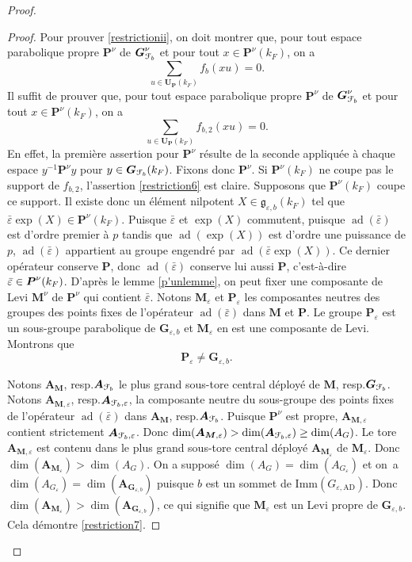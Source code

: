 \documentclass[11pt]{article}
\newcommand{\resp}{resp.\xspace}
\numberwithin{equation}{section}\providecommand{\og}{«\,}\providecommand{\fg}{\,»}
\let\mathcal \EuScript
\let\epsilon\varepsilon
\newcommand{\frg}{\mathfrak{g}}
\newcommand{\AD}{\mathrm{AD}}
\newcommand{\Imm}{\mathrm{Imm}}
\DeclareMathOperator{\ad}{ad}
\newcommand{\bA}{\boldsymbol{A}}
\newcommand{\bG}{\boldsymbol{G}}
\newcommand{\bM}{\boldsymbol{M}}
\newcommand{\bP}{\boldsymbol{P}}
\newcommand{\bU}{\boldsymbol{U}}
\newcommand{\cF}{\mathcal{F}}
\theoremstyle{plain}
\theoremstyle{definition}
\begin{document}
\begin{proof}
\begin{proof}
Pour prouver \eqref{restrictionii}, on doit montrer que, pour tout espace parabolique propre $\bP^{\nu}$ de $\bG_{\cF_{b}}^{\nu}$ et pour tout $x\in \bP^{\nu}(k_{F})$, on a
\[
\sum_{u\in \bU_{\bP}(k_{F})}f_{b}(xu)=0.
\]
Il suffit de prouver que, pour tout espace parabolique propre $\bP^{\nu}$ de $\bG_{\cF_{b}}^{\nu}$ et pour tout $x\in \bP^{\nu}(k_{F})$, on a
\begin{equation}\tag{6}\label{restriction6}
\sum_{u\in \bU_{\bP}(k_{F})}f_{b,2}(xu)=0.
\end{equation}
En effet, la première assertion pour $\bP^{\nu}$ résulte de la seconde appliquée à chaque espace $y^{-1}\bP^{\nu}y$ pour $y\in \bG_{\cF_{b}}(k_{F})$. Fixons donc $\bP^{\nu}$. Si $\bP^{\nu}(k_{F})$ ne coupe pas le support de $f_{b,2}$, l'assertion \eqref{restriction6} est claire. Supposons que $\bP^{\nu}(k_{F})$ coupe ce support. Il existe donc un élément nilpotent $X\in \boldsymbol{\frg}_{\epsilon,b}(k_{F})$ tel que $\bar{\epsilon}\exp(X)\in \bP^{\nu}(k_{F})$. Puisque $\bar{\epsilon}$ et $\exp(X)$ commutent, puisque $\ad(\bar{\epsilon})$ est d'ordre premier à $p$ tandis que $\ad(\exp(X))$ est d'ordre une puissance de $p$, $\ad(\bar{\epsilon})$ appartient au groupe engendré par $\ad(\bar{\epsilon}\exp(X))$. Ce dernier opérateur conserve $\bP$, donc $\ad(\bar{\epsilon})$ conserve lui aussi $\bP$, c'est-à-dire $\bar{\epsilon}\in\nobreak \bP^{\nu}(k_{F})$. D'après le lemme \ref{p'unlemme}, on peut fixer une composante de Levi $\bM^{\nu}$ de $\bP^{\nu}$ qui contient $\bar{\epsilon}$. Notons $\bM_{\epsilon}$ et $\bP_{\epsilon}$ les composantes neutres des groupes des points fixes de l'opérateur $\ad(\bar{\epsilon})$ dans $\bM$ et $\bP$. Le groupe $\bP_{\epsilon}$ est un sous-groupe parabolique de $\bG_{\epsilon,b}$ et $\bM_{\epsilon}$ en est une composante de Levi. Montrons que
\begin{equation}\tag{7}\label{restriction7}
\bP_{\epsilon}\neq\bG_{\epsilon,b}.
\end{equation}

Notons $\bA_{\bM}$, \resp $\bA_{\cF_{b}}$ le plus grand sous-tore central déployé de $\bM$, \resp $\bG_{\cF_{b}}$. Notons $\bA_{\bM,\epsilon}$, \resp $\bA_{\cF_{b},\epsilon}$, la composante neutre du sous-groupe des points fixes de l'opérateur $\ad(\bar{\epsilon})$ dans $\bA_{\bM}$, \resp $\bA_{\cF_{b}}$. Puisque $\bP^{\nu}$ est propre, $\bA_{\bM,\epsilon}$ contient strictement $\bA_{\cF_{b},\epsilon}$. Donc $\dim(\bA_{\bM,\epsilon})>\dim(\bA_{\cF_{b},\epsilon})\geq \dim(A_{G})$. Le tore $\bA_{\bM,\epsilon}$ est contenu dans le plus grand sous-tore central déployé $\bA_{\bM_{\epsilon}}$ de $\bM_{\epsilon}$. Donc $\dim(\bA_{\bM_{\epsilon}})> \dim(A_{G})$. On a supposé $\dim(A_{G})=\dim(A_{G_{\epsilon}})$ et on~a $\dim(A_{G_{\epsilon}})=\dim(\bA_{\bG_{\epsilon,b}})$ puisque $b$ est un sommet de $\Imm(G_{\epsilon,\AD})$. Donc $\dim(\bA_{\bM_{\epsilon}})> \dim(\bA_{\bG_{\epsilon,b}})$, ce qui signifie que $\bM_{\epsilon}$ est un Levi propre de $\bG_{\epsilon,b}$. Cela démontre \eqref{restriction7}.


\end{proof}
\end{proof}
\end{document}
